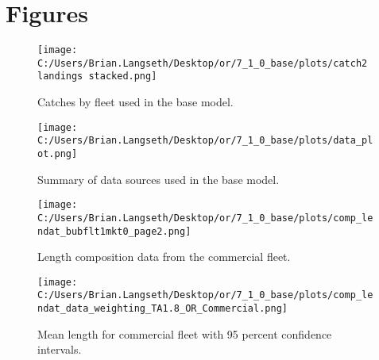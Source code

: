 \documentclass[11pt,
  english,
  a4paper,
]{article}
\begin{document}
\newpage

\clearpage


\hypertarget{figures}{%
\section{Figures}\label{figures}}

\leavevmode\tagmcend\tagstructend


\begin{figure}
\centering
\texttt{[image: C:/Users/Brian.Langseth/Desktop/or/7\_1\_0\_base/plots/catch2 landings stacked.png]}
\caption{Catches by fleet used in the base model.\label{fig:catch}}
\end{figure}

\tagmcend\tagstructend


\begin{figure}
\centering
\texttt{[image: C:/Users/Brian.Langseth/Desktop/or/7\_1\_0\_base/plots/data\_plot.png]}
\caption{Summary of data sources used in the base model.\label{fig:data-plot}}
\end{figure}

\tagmcend\tagstructend


\begin{figure}
\centering
\texttt{[image: C:/Users/Brian.Langseth/Desktop/or/7\_1\_0\_base/plots/comp\_lendat\_bubflt1mkt0\_page2.png]}
\caption{Length composition data from the commercial fleet.\label{fig:com-len-data}}
\end{figure}

\tagmcend\tagstructend


\begin{figure}
\centering
\texttt{[image: C:/Users/Brian.Langseth/Desktop/or/7\_1\_0\_base/plots/comp\_lendat\_data\_weighting\_TA1.8\_OR\_Commercial.png]}
\caption{Mean length for commercial fleet with 95 percent confidence intervals.\label{fig:mean-com-len-data}}
\end{figure}
\end{document}
